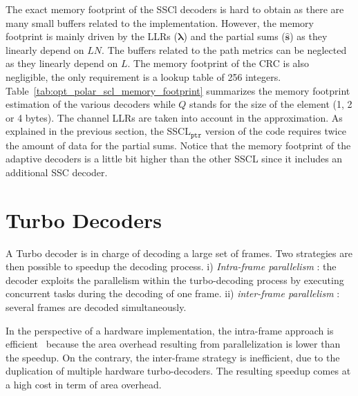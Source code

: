 The exact memory footprint of the SSCl decoders is hard to obtain as there are
many small buffers related to the implementation. However, the memory footprint
is mainly driven by the LLRs ($\bm{\lambda}$) and the partial sums
($\bm{\hat{s}}$) as they linearly depend on $LN$. The buffers related to the
path metrics can be neglected as they linearly depend on $L$. The memory
footprint of the CRC is also negligible, the only requirement is a lookup table
of 256 integers. Table~\ref{tab:opt_polar_scl_memory_footprint} summarizes the
memory footprint estimation of the various decoders while $Q$ stands for the
size of the element (1, 2 or 4 bytes). The channel LLRs are taken into account
in the approximation. As explained in the previous section, the
SSCL$_{\texttt{ptr}}$ version of the code requires twice the amount of data for
the partial sums. Notice that the memory footprint of the adaptive decoders is a
little bit higher than the other SSCL since it includes an additional SSC
decoder.

\section{Turbo Decoders}



A Turbo decoder is in charge of decoding a large set of frames. Two strategies
are then possible to speedup the decoding process. i)
\textit{Intra-frame parallelism} : the decoder exploits the parallelism within
the turbo-decoding process by executing concurrent tasks during
the decoding of one frame. ii) \textit{inter-frame parallelism} : several frames
are decoded simultaneously.

In the perspective of a hardware implementation, the intra-frame approach is
efficient~\cite{Muller2009} because the area overhead resulting from
parallelization is lower than the speedup. On the contrary, the inter-frame
strategy is inefficient, due to the duplication of multiple hardware
turbo-decoders. The resulting speedup comes at a high cost in term of area
overhead.

